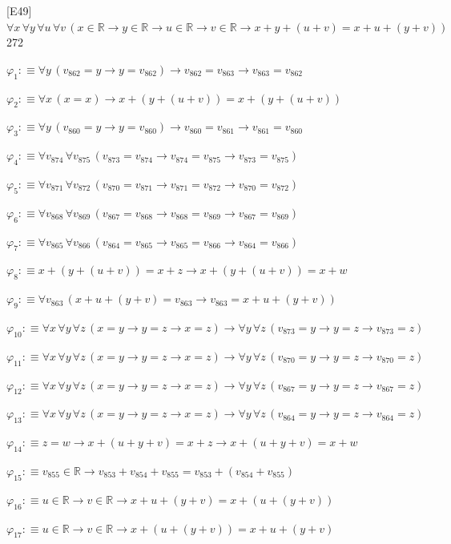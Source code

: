 \begin{fullproof}{[E49]}{$\forall x\,\forall y\,\forall u\,\forall v\,(x \in \mathbb{R} \to y \in \mathbb{R} \to u \in \mathbb{R} \to v \in \mathbb{R} \to x + y + (u + v) = x + u + (y + v))$}{272}
\begin{abbrevlist}
\item $\varphi_{1} :\equiv \forall y\,(v_{862} = y \to y = v_{862}) \to v_{862} = v_{863} \to v_{863} = v_{862}$
\item $\varphi_{2} :\equiv \forall x\,(x = x) \to x + (y + (u + v)) = x + (y + (u + v))$
\item $\varphi_{3} :\equiv \forall y\,(v_{860} = y \to y = v_{860}) \to v_{860} = v_{861} \to v_{861} = v_{860}$
\item $\varphi_{4} :\equiv \forall v_{874}\,\forall v_{875}\,(v_{873} = v_{874} \to v_{874} = v_{875} \to v_{873} = v_{875})$
\item $\varphi_{5} :\equiv \forall v_{871}\,\forall v_{872}\,(v_{870} = v_{871} \to v_{871} = v_{872} \to v_{870} = v_{872})$
\item $\varphi_{6} :\equiv \forall v_{868}\,\forall v_{869}\,(v_{867} = v_{868} \to v_{868} = v_{869} \to v_{867} = v_{869})$
\item $\varphi_{7} :\equiv \forall v_{865}\,\forall v_{866}\,(v_{864} = v_{865} \to v_{865} = v_{866} \to v_{864} = v_{866})$
\item $\varphi_{8} :\equiv x + (y + (u + v)) = x + z \to x + (y + (u + v)) = x + w$
\item $\varphi_{9} :\equiv \forall v_{863}\,(x + u + (y + v) = v_{863} \to v_{863} = x + u + (y + v))$
\item $\varphi_{10} :\equiv \forall x\,\forall y\,\forall z\,(x = y \to y = z \to x = z) \to \forall y\,\forall z\,(v_{873} = y \to y = z \to v_{873} = z)$
\item $\varphi_{11} :\equiv \forall x\,\forall y\,\forall z\,(x = y \to y = z \to x = z) \to \forall y\,\forall z\,(v_{870} = y \to y = z \to v_{870} = z)$
\item $\varphi_{12} :\equiv \forall x\,\forall y\,\forall z\,(x = y \to y = z \to x = z) \to \forall y\,\forall z\,(v_{867} = y \to y = z \to v_{867} = z)$
\item $\varphi_{13} :\equiv \forall x\,\forall y\,\forall z\,(x = y \to y = z \to x = z) \to \forall y\,\forall z\,(v_{864} = y \to y = z \to v_{864} = z)$
\item $\varphi_{14} :\equiv z = w \to x + (u + y + v) = x + z \to x + (u + y + v) = x + w$
\item $\varphi_{15} :\equiv v_{855} \in \mathbb{R} \to v_{853} + v_{854} + v_{855} = v_{853} + (v_{854} + v_{855})$
\item $\varphi_{16} :\equiv u \in \mathbb{R} \to v \in \mathbb{R} \to x + u + (y + v) = x + (u + (y + v))$
\item $\varphi_{17} :\equiv u \in \mathbb{R} \to v \in \mathbb{R} \to x + (u + (y + v)) = x + u + (y + v)$

\end{abbrevlist}
\end{fullproof}
